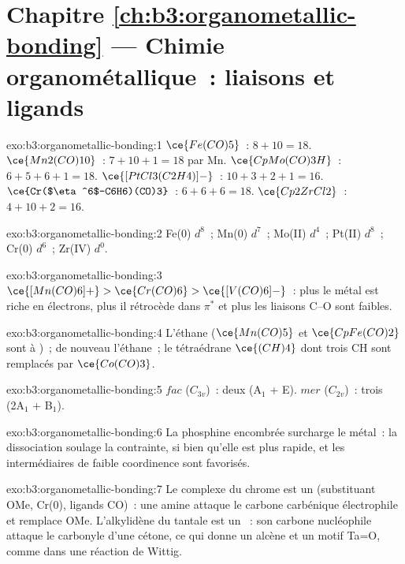 \section*{Chapitre \ref{ch:b3:organometallic-bonding} --- Chimie organométallique~: liaisons et ligands}

\begin{solution}{exo:b3:organometallic-bonding:1}
$\ce{Fe(CO)5}$~: $8 + 10 = 18$. $\ce{Mn2(CO)10}$~: $7 + 10 + 1 = 18$ par Mn. $\ce{CpMo(CO)3H}$~: $6 + 5 + 6 + 1 =
18$. $\ce{[PtCl3(C2H4)]-}$~: $10 + 3 + 2 + 1 = 16$. $\ce{Cr($\eta^6$-C6H6)(CO)3}$~: $6 + 6 + 6 = 18$. $\ce{Cp2ZrCl2}$~:
$4 + 10 + 2 = 16$.
\end{solution}

\begin{solution}{exo:b3:organometallic-bonding:2}
Fe(0) $d^8$~; Mn(0) $d^7$~; Mo(II) $d^4$~; Pt(II) $d^8$~; Cr(0) $d^6$~; Zr(IV) $d^0$.
\end{solution}

\begin{solution}{exo:b3:organometallic-bonding:3}
$\ce{[Mn(CO)6]+} > \ce{Cr(CO)6} > \ce{[V(CO)6]-}$~: plus le métal est riche en électrons, plus il
rétrocède dans $\pi^*$ et plus les liaisons C--O sont faibles.
\end{solution}

\begin{solution}{exo:b3:organometallic-bonding:4}
L'éthane ($\ce{Mn(CO)5}$ et $\ce{CpFe(CO)2}$ sont  à )~; de nouveau l'éthane~; le tétraédrane
$\ce{(CH)4}$ dont trois CH sont remplacés par $\ce{Co(CO)3}$.
\end{solution}

\begin{solution}{exo:b3:organometallic-bonding:5}
$fac$ ($C_{3v}$)~: deux (A$_1$ + E). $mer$ ($C_{2v}$)~: trois (2A$_1$ + B$_1$).
\end{solution}

\begin{solution}{exo:b3:organometallic-bonding:6}
La phosphine encombrée surcharge le métal~: la dissociation soulage la
contrainte, si bien qu'elle est plus rapide, et les intermédiaires de
faible coordinence sont favorisés.
\end{solution}

\begin{solution}{exo:b3:organometallic-bonding:7}
Le complexe du chrome est un  (substituant OMe, Cr(0),
ligands CO)~: une amine attaque le carbone carbénique électrophile et
remplace OMe. L'alkylidène du tantale est un ~: son
carbone nucléophile attaque le carbonyle d'une cétone, ce qui donne un
alcène et un motif Ta=O, comme dans une réaction de Wittig.
\end{solution}

